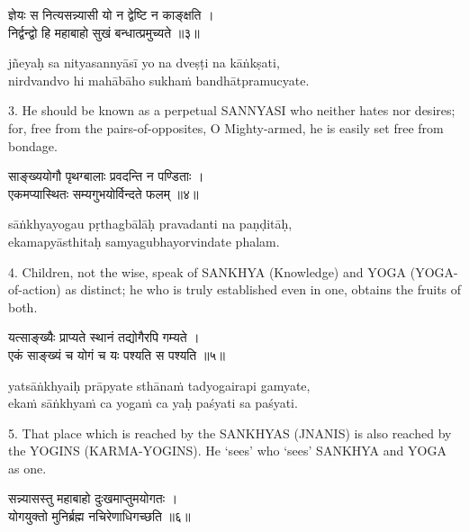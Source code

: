 \begin{gitaverse}
ज्ञेयः स नित्यसन्न्यासी यो न द्वेष्टि न काङ्क्षति । \\
निर्द्वन्द्वो हि महाबाहो सुखं बन्धात्प्रमुच्यते ॥३॥
\end{gitaverse}

\begin{transliteration}
jñeyaḥ sa nityasannyāsī yo na dveṣṭi na kāṅkṣati, \\
nirdvandvo hi mahābāho sukhaṁ bandhātpramucyate.
\end{transliteration}

3. He should be known as a perpetual SANNYASI who neither hates nor desires;
for, free from the pairs-of-opposites, O Mighty-armed, he is easily set free
from bondage.

\begin{gitaverse}
साङ्ख्ययोगौ पृथग्बालाः प्रवदन्ति न पण्डिताः । \\
एकमप्यास्थितः सम्यगुभयोर्विन्दते फलम् ॥४॥
\end{gitaverse}

\begin{transliteration}
sāṅkhyayogau pṛthagbālāḥ pravadanti na paṇḍitāḥ, \\
ekamapyāsthitaḥ samyagubhayorvindate phalam.
\end{transliteration}

4. Children, not the wise, speak of SANKHYA (Knowledge) and YOGA
(YOGA-of-action) as distinct; he who is truly established even in one, obtains
the fruits of both.

\begin{gitaverse}
यत्साङ्ख्यैः प्राप्यते स्थानं तद्योगैरपि गम्यते । \\
एकं साङ्ख्यं च योगं च यः पश्यति स पश्यति ॥५॥
\end{gitaverse}

\begin{transliteration}
yatsāṅkhyaiḥ prāpyate sthānaṁ tadyogairapi gamyate, \\
ekaṁ sāṅkhyaṁ ca yogaṁ ca yaḥ paśyati sa paśyati.
\end{transliteration}

5. That place which is reached by the SANKHYAS (JNANIS) is also reached by the
YOGINS (KARMA-YOGINS). He `sees' who `sees' SANKHYA and YOGA as one.

\begin{gitaverse}
सन्न्यासस्तु महाबाहो दुःखमाप्तुमयोगतः । \\
योगयुक्तो मुनिर्ब्रह्म नचिरेणाधिगच्छति ॥६॥
\end{gitaverse}

